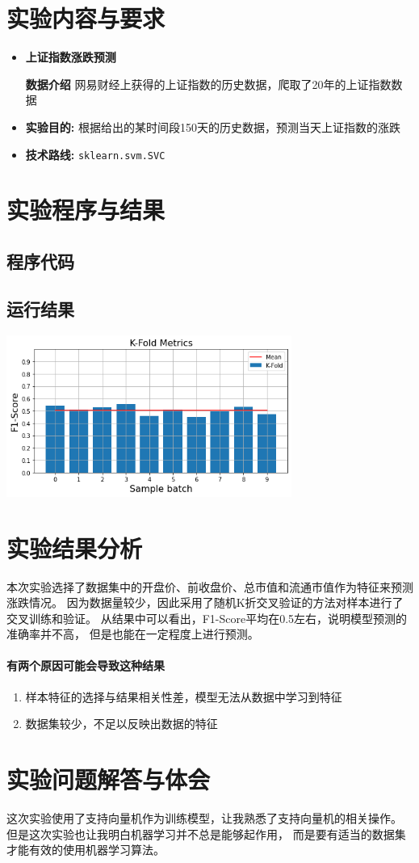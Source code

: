 \documentclass[a4paper]{ctexart}
\begin{document}
  \section{实验内容与要求}
  \begin{itemize}
    \item \textbf{上证指数涨跌预测}

    \textbf{数据介绍}  网易财经上获得的上证指数的历史数据，爬取了20年的上证指数数据
    \item \textbf{实验目的:} 根据给出的某时间段150天的历史数据，预测当天上证指数的涨跌
    \item \textbf{技术路线:} \verb|sklearn.svm.SVC|

  \end{itemize}

  \section{实验程序与结果}
  \subsection{程序代码}
  
  \subsection{运行结果}
  \includegraphics[width=0.7\textwidth]{fig/output.png}

  \section{实验结果分析}
  本次实验选择了数据集中的开盘价、前收盘价、总市值和流通市值作为特征来预测涨跌情况。
  因为数据量较少，因此采用了随机K折交叉验证的方法对样本进行了交叉训练和验证。
  从结果中可以看出，F1-Score平均在0.5左右，说明模型预测的准确率并不高，
  但是也能在一定程度上进行预测。

  \newpage
  \paragraph*{有两个原因可能会导致这种结果}
  \begin{enumerate}
    \item 样本特征的选择与结果相关性差，模型无法从数据中学习到特征
    \item 数据集较少，不足以反映出数据的特征
  \end{enumerate}

  \section{实验问题解答与体会}
  这次实验使用了支持向量机作为训练模型，让我熟悉了支持向量机的相关操作。
  但是这次实验也让我明白机器学习并不总是能够起作用，
  而是要有适当的数据集才能有效的使用机器学习算法。
\end{document}
